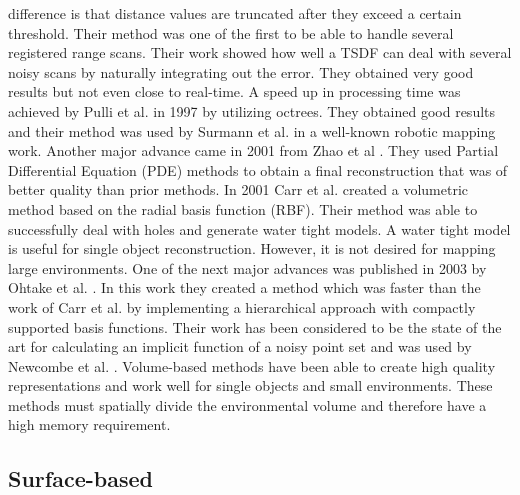 difference is that distance values are truncated after they exceed a
certain threshold. Their method was one of the first to be able to handle
several registered range scans.  Their work showed how well a TSDF can deal
with several noisy scans by naturally integrating out the error. They
obtained very good results but not even close to real-time. A speed up in
processing time was achieved by Pulli et al. in 1997 \cite{Pulli1997} by
utilizing octrees. They obtained good results and their method was used by
Surmann et al. \cite{Surmann2003} in a well-known robotic mapping work.
Another major advance came in 2001 from Zhao et al \cite{Zhao2001}. They
used Partial Differential Equation (PDE) methods to obtain a final
reconstruction that was of better quality than prior methods. In 2001 Carr
et al. \cite{Carr2001} created a volumetric method based on the radial
basis function (RBF). Their method was able to successfully deal with holes
and generate water tight models. A water tight model is useful for single
object reconstruction. However, it is not desired for mapping large
environments. One of the next major advances was published in 2003 by
Ohtake et al. \cite{Ohtake2003}. In this work they created a method which
was faster than the work of Carr et al.  \cite{Carr2001} by implementing a
hierarchical approach with compactly supported basis functions. Their work
has been considered to be the state of the art for calculating an implicit
function of a noisy point set and was used by Newcombe et al.
\cite{Newcombe2010}. Volume-based methods have been able to create high
quality representations and work well for single objects and small
environments. These methods must spatially divide the environmental volume
and therefore have a high memory requirement.

\subsection{Surface-based}

